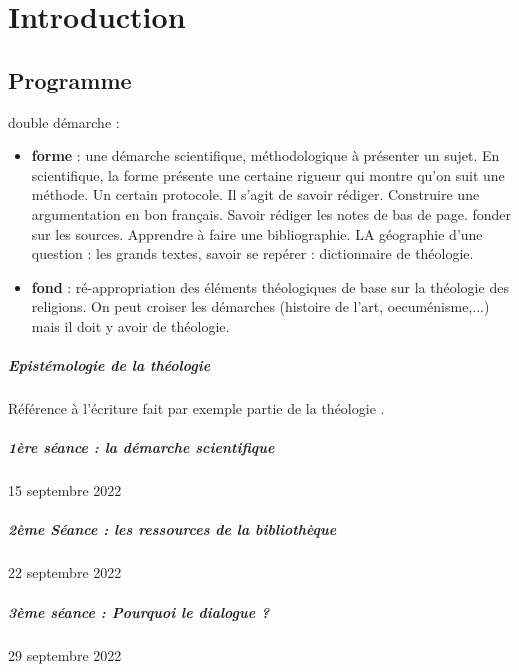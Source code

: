 \chapter{Introduction}
\section{Programme}

double démarche : 
\begin{itemize}
    \item \textbf{forme} : une démarche scientifique, méthodologique à présenter un sujet. En scientifique, la forme présente une certaine rigueur qui montre qu'on suit une méthode. Un certain protocole.
Il s'agit de savoir rédiger. Construire une argumentation en bon français. 
Savoir rédiger les notes de bas de page. fonder sur les sources.
Apprendre à faire une bibliographie. LA géographie d'une question : les grands textes, savoir se repérer : dictionnaire de théologie.
    \item \textbf{fond} : ré-appropriation des éléments théologiques de base sur la théologie des religions. On peut croiser les démarches (histoire de l'art, oecuménisme,...) mais il doit y avoir de théologie.
\end{itemize}

\paragraph{Epistémologie de la théologie} Référence à l'écriture fait par exemple partie de la théologie . 


\paragraph{1ère séance : la démarche scientifique}    15 septembre 2022
\paragraph{2ème Séance : les ressources de la bibliothèque}    22 septembre 2022 
\paragraph{3ème séance : Pourquoi le dialogue ?}    29 septembre 2022 


